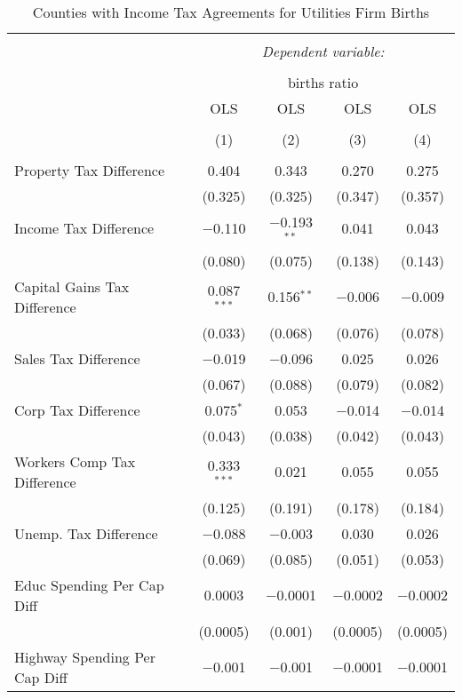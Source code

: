 
\begin{table}[!htbp] \centering 
  \caption{Counties with Income Tax Agreements for  Utilities Firm Births} 
  \label{22rd} 
\begin{tabular}{@{\extracolsep{5pt}}lcccc} 
\\[-1.8ex]\hline 
\hline \\[-1.8ex] 
 & \multicolumn{4}{c}{\textit{Dependent variable:}} \\ 
\cline{2-5} 
\\[-1.8ex] & \multicolumn{4}{c}{births ratio} \\ 
 & OLS & OLS & OLS & OLS \\ 
\\[-1.8ex] & (1) & (2) & (3) & (4)\\ 
\hline \\[-1.8ex] 
 Property Tax Difference & 0.404 & 0.343 & 0.270 & 0.275 \\ 
  & (0.325) & (0.325) & (0.347) & (0.357) \\ 
  Income Tax Difference & $-$0.110 & $-$0.193$^{**}$ & 0.041 & 0.043 \\ 
  & (0.080) & (0.075) & (0.138) & (0.143) \\ 
  Capital Gains Tax Difference & 0.087$^{***}$ & 0.156$^{**}$ & $-$0.006 & $-$0.009 \\ 
  & (0.033) & (0.068) & (0.076) & (0.078) \\ 
  Sales Tax Difference & $-$0.019 & $-$0.096 & 0.025 & 0.026 \\ 
  & (0.067) & (0.088) & (0.079) & (0.082) \\ 
  Corp Tax Difference & 0.075$^{*}$ & 0.053 & $-$0.014 & $-$0.014 \\ 
  & (0.043) & (0.038) & (0.042) & (0.043) \\ 
  Workers Comp Tax Difference & 0.333$^{***}$ & 0.021 & 0.055 & 0.055 \\ 
  & (0.125) & (0.191) & (0.178) & (0.184) \\ 
  Unemp. Tax Difference & $-$0.088 & $-$0.003 & 0.030 & 0.026 \\ 
  & (0.069) & (0.085) & (0.051) & (0.053) \\ 
  Educ Spending Per Cap Diff & 0.0003 & $-$0.0001 & $-$0.0002 & $-$0.0002 \\ 
  & (0.0005) & (0.001) & (0.0005) & (0.0005) \\ 
  Highway Spending Per Cap Diff & $-$0.001 & $-$0.001 & $-$0.0001 & $-$0.0001 \\ 

\end{tabular}
\end{table}
